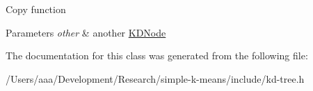 Copy function 
\begin{DoxyParams}{Parameters}
{\em other} & another \hyperlink{classSimpleCluster_1_1KDNode}{K\+D\+Node} \\
\hline
\end{DoxyParams}


The documentation for this class was generated from the following file\+:\begin{DoxyCompactItemize}
\item 
/\+Users/aaa/\+Development/\+Research/simple-\/k-\/means/include/kd-\/tree.\+h\end{DoxyCompactItemize}
